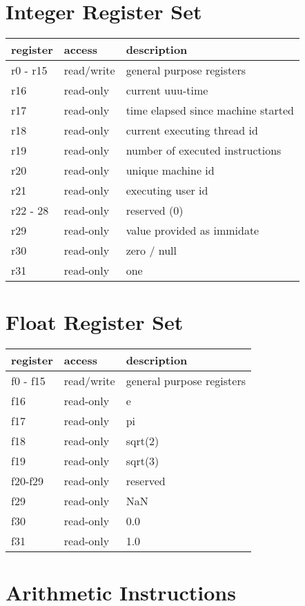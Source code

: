 \documentclass[letterpaper,10pt,openright,twoside,onecolumn]{book}
\begin{document}
\section{Integer Register Set}
  \begin{tabular}{@{}l l l@{}}
   \hline
    register & access & description \\
   \hline
    r0 - r15 & read/write & general purpose registers \\
    r16 & read-only & current uuu-time \\
    r17 & read-only & time elapsed since machine started \\
    r18 & read-only & current executing thread id \\
    r19 & read-only & number of executed instructions \\
    r20 & read-only & unique machine id \\
    r21 & read-only & executing user id \\
    r22 - 28 & read-only & reserved (0) \\
    r29 & read-only & value provided as immidate \\
    r30 & read-only & zero / null \\
    r31 & read-only & one \\
   \hline
  \end{tabular}

\section{Float Register Set}
  \begin{tabular}{@{}l l l@{}}
   \hline
    register & access & description \\
   \hline
    f0 - f15 & read/write & general purpose registers \\
    f16 & read-only & e \\
    f17 & read-only & pi \\
    f18 & read-only & sqrt(2) \\
    f19 & read-only & sqrt(3) \\
    f20-f29 & read-only & reserved \\
    f29 & read-only & NaN \\
    f30 & read-only & 0.0 \\
    f31 & read-only & 1.0 \\
   \hline
  \end{tabular}

\clearpage\section{Arithmetic Instructions}
\end{document}
